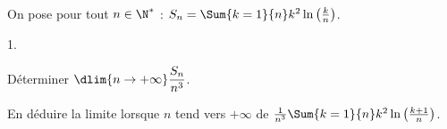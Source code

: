 \documentclass[11pt]{article}%
\begin{document}

\begin{exerciceSP}~\\
  On pose pour tout $n \in \N^*$ : $S_n = \Sum{k=1}{n} k^2
  \ln \left( \frac{ k }{ n } \right)$.
  \begin{noliste}{1.}
    \setlength{\itemsep}{2mm}
  \item Déterminer $\dlim{n \rightarrow + \infty} \dfrac{S_n}{ n^3}$.

  \item En déduire la limite lorsque $n$ tend vers $+\infty$ de
    $\frac{1}{n^3} \Sum{k=1}{n} k^2 \ln \left( \frac{ k+1 }{ n }
    \right)$.

  \end{noliste}
\end{exerciceSP}


\newpage


\end{document}
